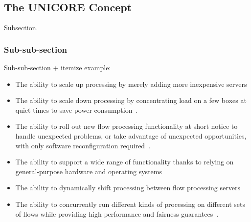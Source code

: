 \subsection {The UNICORE Concept}

Subsection.  

\subsubsection{Sub-sub-section}

Sub-sub-section + itemize example:

\begin{itemize}
  \item The ability to scale up processing by merely adding more inexpensive servers
  \item The ability to scale down processing by concentrating load on a few boxes
    at quiet times to save power consumption~\cite{latexcompanion}.
  \item The ability to roll out new flow processing functionality at short notice
    to handle unexpected problems, or take advantage of unexpected opportunities,
    with only software reconfiguration required~\cite{einstein}.
  \item The ability to support a wide range of functionality thanks to relying on
    general-purpose hardware and operating systems
  \item The ability to dynamically shift processing between flow processing servers
  \item The ability to concurrently run different kinds of processing on
    different sets of flows while providing high performance and fairness
    guarantees~\cite{knuthwebsite}.
\end{itemize}



